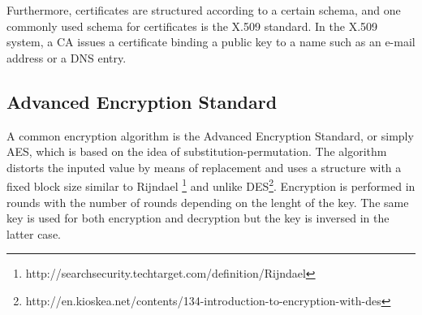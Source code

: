 Furthermore, certificates are structured according to a certain schema, and one commonly used schema for certificates is the X.509 standard\cite{IETFX509:Online}. In the X.509 system, a CA issues a certificate binding a public key to a name such as an e-mail address or a DNS entry.

\subsection{Advanced Encryption Standard}
A common encryption algorithm is the Advanced Encryption Standard, or simply AES, which is based on the idea of substitution-permutation\cite{AESISFAST:Online}. The algorithm distorts the inputed value by means of replacement and uses a structure with a fixed block size similar to Rijndael \footnote{http://searchsecurity.techtarget.com/definition/Rijndael} and unlike DES\footnote{http://en.kioskea.net/contents/134-introduction-to-encryption-with-des}. Encryption is performed in rounds with the number of rounds depending on the lenght of the key. The same key is used for both encryption and decryption but the key is inversed in the latter case.

